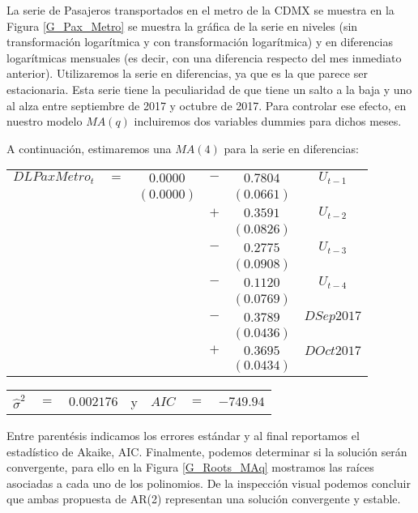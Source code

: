 \documentclass[
  a4paper,
]{article}
\begin{document}
La serie de Pasajeros transportados en el metro de la CDMX se muestra en
la Figura \ref{G_Pax_Metro} se muestra la gráfica de la serie en niveles
(sin transformación logarítmica y con transformación logarítmica) y en
diferencias logarítmicas mensuales (es decir, con una diferencia
respecto del mes inmediato anterior). Utilizaremos la serie en
diferencias, ya que es la que parece ser estacionaria. Esta serie tiene
la peculiaridad de que tiene un salto a la baja y uno al alza entre
septiembre de 2017 y octubre de 2017. Para controlar ese efecto, en
nuestro modelo \(MA(q)\) incluiremos dos variables dummies para dichos
meses.

A continuación, estimaremos una \(MA(4)\) para la serie en diferencias:

\begin{center}
\begin{tabular}{ c c c c c c } 
    $DLPaxMetro_t$ & $=$ & $0.0000$ & $-$ & $0.7804$  & $U_{t-1}$ \\ 
    &  & $(0.0000)$ &  & $(0.0661)$ & \\
    &  &  & $+$ & $0.3591$ & $U_{t-2}$ \\
    &  &  &  & $(0.0826)$ & \\
    &  &  & $-$ & $0.2775$ & $U_{t-3}$ \\
    &  &  &  & $(0.0908)$ & \\
    &  &  & $-$ & $0.1120$ & $U_{t-4}$ \\
    &  &  &  & $(0.0769)$ & \\
    &  &  & $-$ & $0.3789$ & $DSep2017$ \\
    &  &  &  & $(0.0436)$ & \\
    &  &  & $+$ & $0.3695$ & $DOct2017$ \\
    &  &  &  & $(0.0434)$ & 
\end{tabular}
\end{center}

\begin{center}
\begin{tabular}{ c c c c c c c } 
    $\hat{\sigma}^2$ & $=$ & $0.002176$ & y & $AIC$ & $=$ & $-749.94$ 
\end{tabular}
\end{center}

Entre parentésis indicamos los errores estándar y al final reportamos el
estadístico de Akaike, AIC. Finalmente, podemos determinar si la
solución serán convergente, para ello en la Figura \ref{G_Roots_MAq}
mostramos las raíces asociadas a cada uno de los polinomios. De la
inspección visual podemos concluir que ambas propuesta de AR(2)
representan una solución convergente y estable.
\end{document}
